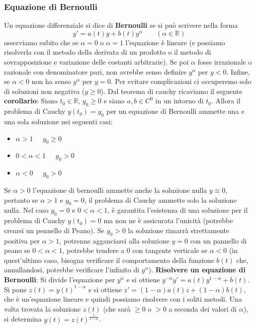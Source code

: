 \subsubsection{Equazione di Bernoulli}
Un equazione differenziale si dice di \textbf{Bernoulli} se si può scrivere nella forma
\[
    y' = a(t)y + b(t) y^\alpha \;\;\;\;\;\;\;(\alpha \in \mathbb{R})
\]
osserviamo subito che se $\alpha=0$ o $\alpha = 1$ l'equazione è lineare (e possiamo risolverla con il metodo della derivata di un prodotto o il metodo di sovrapposizione e variazione delle costanti arbitrarie). Se poi $\alpha$ fosse irrazionale o razionale con denominatore pari, non avrebbe senso definire $y^\alpha$ per $y < 0$. Infine, se $\alpha < 0$ non ha senso $y^\alpha$ per $y=0$.\newline
\newline
Per evitare complicazioni ci occuperemo solo di soluzioni non negativa ($y \geq 0$).\newline
\newline
Dal teorema di cauchy ricaviamo il seguente \textbf{corollario}:\newline
Siano $t_0 \in \mathbb{R}$, $y_0 \geq 0$ e siano $a,b \in C^0$ in un intorno di $t_0$. Allora il problema di Cauchy $y(t_0) = y_0$ per un equazione di Bernoulli ammette una e una sola soluzione nei seguenti casi:
\begin{itemize}
    \item $\alpha> 1 \;\;\;\;\; y_0 \geq 0$
    \item $0< \alpha< 1 \;\;\;\;\;y_0 > 0$
    \item $\alpha<0 \;\;\;\;\;y_0 > 0$
\end{itemize}
Se $\alpha > 0$ l'equazione di bernoulli ammette anche la soluzione nulla $y \equiv 0$, pertanto se  $\alpha > 1$ e $y_0 = 0$, il problema di Cauchy ammette solo la soluzione nulla.\newline
Nel caso $y_0 = 0$ e $0<\alpha < 1$, è garantita l'esistenza di una soluzione per il problema di Cauchy $y(t_0) = 0$ ma non ne è assicurata l'unicità (potrebbe crearsi un pennello di Peano).\newline
Se $y_0 > 0$ la soluzione rimarrà strettamente positiva per $\alpha > 1$, potrenne agganciarsi alla soluzione $y= 0$ con un pannello di peano se $0< \alpha<1$, potrebbe tendere a $0$ con tangente verticale se $\alpha<0$ (in quest'ultimo caso, bisogna verificare il comportamento della funzione $b(t)$ che, annullandosi, potrebbe verificare l'infinito di $y^\alpha$).\newline
\newline
\textbf{Risolvere un equazione di Bernoulli}:\newline
Si divide l'equazione per $y^\alpha$ e si ottiene $y^{-\alpha} y' = a(t) y^{1-\alpha} + b(t)$.\newline
Si pone $z(t) = y(t)^{1-\alpha}$ e si ottiene $z' = (1-\alpha)a(t)z + (1-\alpha) b(t)$, che è un'equazione lineare e quindi possiamo risolvere con i soliti metodi. Una volta trovata la soluzione $z(t)$ (che sarà $\geq 0$ o $>0$ a seconda dei valori di $\alpha$), si determina $y(t) = z(t)^{\frac{1}{1-\alpha}}$.
